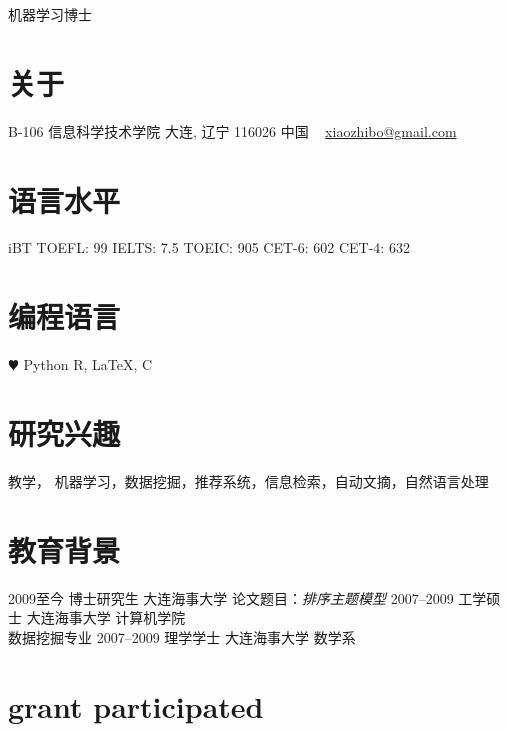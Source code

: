 \documentclass[]{friggeri-cv}
\begin{document}
       {机器学习博士}


\begin{aside}
  \section{关于}
    B-106
    信息科学技术学院
    大连, 辽宁 116026
    中国
    ~
    \href{mailto:xiaozhibo@gmail.com}{xiaozhibo@gmail.com}
  \section{语言水平}
    iBT TOEFL: 99
    IELTS: 7.5
    TOEIC: 905
    CET-6: 602
    CET-4: 632
  \section{编程语言}
    {\color{red} $\varheartsuit$} Python
    R, \LaTeX, C
\end{aside}

\section{研究兴趣}

教学， 机器学习，数据挖掘，推荐系统，信息检索，自动文摘，自然语言处理


\section{教育背景}


\begin{entrylist}
  \entry
    {2009至今}
    {博士研究生}
    {大连海事大学}
    {论文题目：\emph{排序主题模型}}
  \entry
    {2007–2009}
    {工学硕士}
    {大连海事大学}
    {计算机学院\\
    数据挖掘专业}
  \entry
    {2007–2009}
    {理学学士}
    {大连海事大学}
    {数学系}
\end{entrylist}

\section{grant participated}
\end{document}
